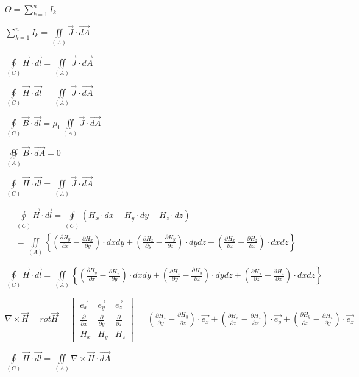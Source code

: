 $\Theta=\sum_{k=1}^nI_k$

$\sum_{k=1}^nI_k=\iint\limits_{(A)}\vec{J}\cdot\overrightarrow{dA}$

$\oint\limits_{(C)}\vec{H}\cdot\overrightarrow{dl}=\iint\limits_{(A)}\vec{J}\cdot\overrightarrow{dA}$

$\oint\limits_{(C)}\vec{H}\cdot\overrightarrow{dl}=\iint\limits_{(A)}\vec{J}\cdot\overrightarrow{dA}$

$\oint\limits_{(C)}\vec{B}\cdot\overrightarrow{dl}=\mu_0\iint\limits_{(A)}\vec{J}\cdot\overrightarrow{dA}$

$\underset{(A)}{\operatorname*{\oiint}}\overrightarrow{B}\cdot\overrightarrow{dA}=0$

$\oint\limits_{(C)}\vec{H}\cdot\overrightarrow{dl}=\iint\limits_{(A)}\vec{J}\cdot\overrightarrow{dA}$

$\begin{aligned}
&\oint\limits_{(C)}\vec{H}\cdot\overrightarrow{dl}=\oint\limits_{(C)}(H_x\cdot dx+H_y\cdot dy+H_z\cdot dz) \\
&=\iint\limits_{(A)}\left\{\left(\frac{\partial H_y}{\partial x}-\frac{\partial H_x}{\partial y}\right)\cdot dxdy+\left(\frac{\partial H_z}{\partial y}-\frac{\partial H_y}{\partial z}\right)\cdot dydz+\left(\frac{\partial H_x}{\partial z}-\frac{\partial H_z}{\partial x}\right)\cdot dxdz\right\}
\end{aligned}$

$\oint\limits_{(C)}\vec{H}\cdot\overrightarrow{dl}=\iint\limits_{(A)}\left\{\left(\frac{\partial H_y}{\partial x}-\frac{\partial H_x}{\partial y}\right)\cdot dxdy+\left(\frac{\partial H_z}{\partial y}-\frac{\partial H_y}{\partial z}\right)\cdot dydz+\left(\frac{\partial H_x}{\partial z}-\frac{\partial H_z}{\partial x}\right)\cdot dxdz\right\}$

$\nabla\times\vec{H}=rot \vec{H}=\begin{vmatrix}\overrightarrow{e_x}&\overrightarrow{e_y}&\overrightarrow{e_z}\\\frac{\partial}{\partial x}&\frac{\partial}{\partial y}&\frac{\partial}{\partial z}\\H_x&H_y&H_z\end{vmatrix}=\left(\frac{\partial H_z}{\partial y}-\frac{\partial H_y}{\partial z}\right)\cdot\overrightarrow{e_x}+\left(\frac{\partial H_x}{\partial z}-\frac{\partial H_z}{\partial x}\right)\cdot\overrightarrow{e_y}+\left(\frac{\partial H_y}{\partial x}-\frac{\partial H_x}{\partial y}\right)\cdot\overrightarrow{e_z}$

$\oint\limits_{(C)}\overrightarrow{H}\cdot\overrightarrow{dl}=\iint\limits_{(A)}\nabla\times\overrightarrow{H}\cdot\overrightarrow{dA}$


